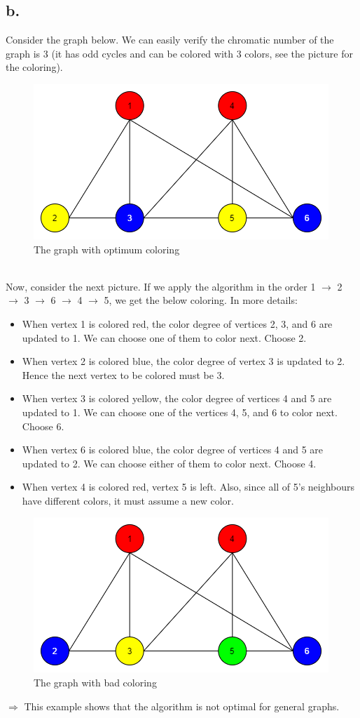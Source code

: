 \documentclass{article}
\begin{document}
\subsection*{b.}
Consider the graph below. We can easily verify the chromatic number of the graph is 3 (it has odd cycles and can be colored with 3 colors, see the picture for the coloring).
\begin{figure}[h]
    \centering
    \includegraphics[scale = 0.45]{3b_1}
    \caption{The graph with optimum coloring}
\end{figure} \\
Now, consider the next picture. If we apply the algorithm in the order 1 $\rightarrow$ 2 $\rightarrow$ 3 $\rightarrow$ 6 $\rightarrow$ 4 $\rightarrow$ 5, we get the below coloring. In more details:
\begin{itemize}
\item When vertex 1 is colored red, the color degree of vertices 2, 3, and 6 are updated to 1. We can choose one of them to color next. Choose 2.
\item When vertex 2 is colored blue, the color degree of vertex 3 is updated to 2. Hence the next vertex to be colored must be 3.
\item When vertex 3 is colored yellow, the color degree of vertices 4 and 5 are updated to 1. We can choose one of the vertices 4, 5, and 6 to color next. Choose 6.
\item When vertex 6 is colored blue, the color degree of vertices 4 and 5 are updated to 2. We can choose either of them to color next. Choose 4.
\item When vertex 4 is colored red, vertex 5 is left. Also, since all of 5's neighbours have different colors, it must assume a new color.
\end{itemize}
\begin{figure}[h]
    \centering
    \includegraphics[scale = 0.45]{3b_2}
    \caption{The graph with bad coloring}
\end{figure}
$\Rightarrow$ This example shows that the algorithm is not optimal for general graphs.
 
\end{document}
